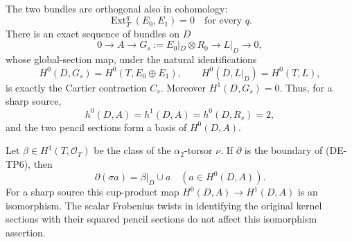 \begin{lemma}
\label{lem:DE-A3-positive-pencil-contraction-candidate}
The two bundles are orthogonal also in cohomology:
\[
                  \operatorname{Ext}^q_T(E_0,E_1)=0
                         \quad\text{for every }q.
                                                        \tag{DE-TP5}
\]
There is an exact sequence of bundles on $D$
\[
 0\longrightarrow A\longrightarrow G_s:=E_0|_D\otimes R_0
                  \longrightarrow L|_D\longrightarrow0,
                                                        \tag{DE-TP6}
\]
whose global-section map, under the natural identifications
\[
 H^0(D,G_s)=H^0(T,E_0\oplus E_1),\qquad
 H^0(D,L|_D)=H^0(T,L),
\]
is exactly the Cartier contraction $C_s$. Moreover $H^1(D,G_s)=0$.
Thus, for a sharp source,
\[
                  h^0(D,A)=h^1(D,A)=h^0(D,R_s)=2,
\]
and the two pencil sections form a basis of $H^0(D,A)$.

Let $\beta\in H^1(T,\mathcal O_T)$ be the class of the
$\alpha_2$-torsor $\nu$. If $\partial$ is the boundary of
(DE-TP6), then
\[
                    \partial(\sigma a)=\beta|_D\cup a
                         \quad(a\in H^0(D,A)).          \tag{DE-TP7}
\]
For a sharp source this cup-product map $H^0(D,A)\to H^1(D,A)$
is an isomorphism. The scalar Frobenius twists in identifying
the original kernel sections with their squared pencil sections
do not affect this isomorphism assertion.
\end{lemma}
